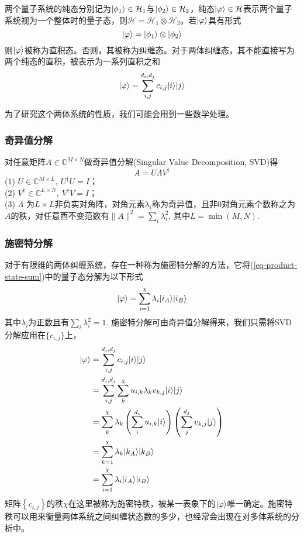两个量子系统的纯态分别记为$\lvert\phi_1\rangle\in\mathcal{H}_1$与$\lvert\phi_2\rangle\in\mathcal{H}_2$，纯态$\lvert\varphi\rangle\in\mathcal{H}$表示两个量子系统视为一个整体时的量子态，则$\mathcal{H} = \mathcal{H}_1\otimes\mathcal{H}_2$。若$\lvert\varphi\rangle$具有形式
\begin{equation}\label{eq-product-state}
\lvert\varphi\rangle=\lvert\phi_1\rangle\otimes\lvert\phi_2\rangle
\end{equation}
则$\lvert\varphi\rangle$被称为直积态。否则，其被称为纠缠态。对于两体纠缠态，其不能直接写为两个纯态的直积，被表示为一系列直积之和
\begin{equation}\label{eq-product-state-sum}
\lvert\varphi\rangle = \sum_{i,j}^{d_i,d_j} c_{i,j}\lvert i\rangle\lvert j\rangle
\end{equation}

为了研究这个两体系统的性质，我们可能会用到一些数学处理。

\subsubsection{奇异值分解}

对任意矩阵$A\in\mathbb{C}^{M\times N}$做奇异值分解\cite{stewartEarlyHistorySingular1993}(Singular Value Decomposition, SVD)得
\begin{equation}\label{eq-SVD}
A = U \Lambda V^\dagger
\end{equation}
(1) $U\in\mathbb{C}^{M\times L},\: U^\dagger U=I$；\\(2) $V^\dagger\in\mathbb{C}^{L\times N},\: V^\dagger V=I$；\\(3) $\Lambda$ 为$L\times L$非负实对角阵，对角元素$\lambda_i$称为奇异值，且非$0$对角元素个数称之为$A$的秩，对任意酉不变范数有$\lVert A \rVert^2=\sum_i \lambda_i^2$. 其中$L=\min(M,N)$.

\subsubsection{施密特分解}

对于有限维的两体纠缠系统，存在一种称为施密特分解的方法，它将(\ref{eq-product-state-sum})中的量子态分解为以下形式
\begin{equation}
\lvert\varphi\rangle=\sum_{i=1}^{\chi} \lambda_i \lvert i_A\rangle\lvert i_B\rangle
\end{equation}
其中$\lambda_i$为正数且有$\sum_i \lambda_i^2 = 1$. 施密特分解可由奇异值分解得来，我们只需将SVD分解应用在$\{c_{i,j}\}$上，
\begin{align}
	\lvert\varphi\rangle &= \sum_{i,j}^{d_i,d_j} c_{i,j}\lvert i\rangle\lvert j\rangle \\
		 &= \sum_{i,j}^{d_i,d_j} \sum_k^\chi u_{i,k} \lambda_{k} v_{k,j} \lvert i\rangle\lvert j\rangle\\
		 &= \sum_k^\chi \lambda_k \left( \sum_i^{d_i}u_{i,k}\lvert i\rangle \right) \left( \sum_j^{d_j}v_{k,j}\lvert j\rangle \right)\\
		 &= \sum_{k=1}^{\chi} \lambda_k \lvert k_A\rangle\lvert k_B\rangle\\
		 &= \sum_{i=1}^{\chi} \lambda_i \lvert i_A\rangle\lvert i_B\rangle
\end{align}
矩阵$\left\{c_{i,j}\right\}$的秩$\chi$在这里被称为施密特秩，被某一表象下的$\lvert\varphi\rangle$唯一确定。施密特秩可以用来衡量两体系统之间纠缠状态数的多少，也经常会出现在对多体系统的分析中。


